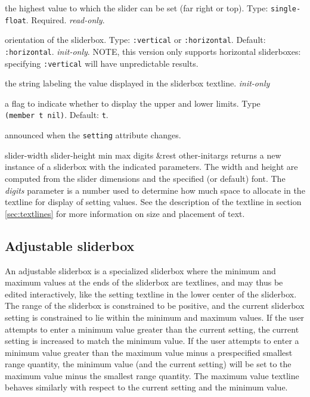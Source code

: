 \documentclass[twoside,openright,11pt]{report}
\newcommand{\tp}[1]{\texttt{#1}}
\begin{document}
{the highest value to which the slider can be set (far right or top).
Type: \tp{single-float}.  Required.  \emph{read-only}.}

{orientation of the sliderbox.  Type: \tp{:vertical} or
\tp{:horizontal}.  Default: \tp{:horizontal}.  \textit{init-only}.
NOTE, this version only supports horizontal sliderboxes: specifying
\tp{:vertical} will have unpredictable results.}

{the string labeling the value displayed in the sliderbox textline.
\textit{init-only}}

{a flag to indicate whether to display the upper and lower limits.
Type \tp{(member~t~nil)}.  Default: \tp{t}.}


{announced when the \tp{setting} attribute changes.}


{slider-width slider-height min max digits \&rest other-initargs}
{returns a new instance of a sliderbox with the indicated parameters.
The width and height are computed from the slider dimensions and the
specified (or default) font.  The \emph{digits} parameter is a number
used to determine how much space to allocate in the textline for
display of setting values.  See the description of the textline in
section \ref{sec:textlines} for more information on size and placement
of text.}

\subsection{Adjustable sliderbox}

An adjustable sliderbox is a specialized
sliderbox where the minimum and maximum values at the ends of the
sliderbox are textlines, and may thus be edited interactively, like
the setting textline in the lower center of the sliderbox.  The range
of the sliderbox is constrained to be positive, and the current
sliderbox setting is constrained to lie within the minimum and maximum
values.  If the user attempts to enter a minimum value greater than
the current setting, the current setting is increased to match the
minimum value.  If the user attempts to enter a minimum value greater
than the maximum value minus a prespecified smallest range quantity,
the minimum value (and the current setting) will be set to the maximum
value minus the smallest range quantity.  The maximum value textline
behaves similarly with respect to the current setting and the minimum
value.
\end{document}
